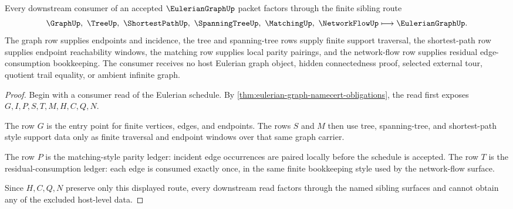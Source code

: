 \begin{theorem}
\label{thm:eulerian-graph-sibling-dependency}
Every downstream consumer of an accepted $\EulerianGraphUp$ packet factors through the finite sibling route
$$
\GraphUp,\ \TreeUp,\ \ShortestPathUp,\ \SpanningTreeUp,\ \MatchingUp,\ \NetworkFlowUp
\longmapsto
\EulerianGraphUp .
$$
The graph row supplies endpoints and incidence, the tree and spanning-tree rows supply finite support traversal, the shortest-path row supplies endpoint reachability windows, the matching row supplies local parity pairings, and the network-flow row supplies residual edge-consumption bookkeeping. The consumer receives no host Eulerian graph object, hidden connectedness proof, selected external tour, quotient trail equality, or ambient infinite graph.
\end{theorem}
\begin{proof}
Begin with a consumer read of the Eulerian schedule. By \autoref{thm:eulerian-graph-namecert-obligations}, the read first exposes $G,I,P,S,T,M,H,C,Q,N$.

The row $G$ is the entry point for finite vertices, edges, and endpoints. The rows $S$ and $M$ then use tree, spanning-tree, and shortest-path style support data only as finite traversal and endpoint windows over that same graph carrier.

The row $P$ is the matching-style parity ledger: incident edge occurrences are paired locally before the schedule is accepted. The row $T$ is the residual-consumption ledger: each edge is consumed exactly once, in the same finite bookkeeping style used by the network-flow surface.

Since $H,C,Q,N$ preserve only this displayed route, every downstream read factors through the named sibling surfaces and cannot obtain any of the excluded host-level data.
\end{proof}


